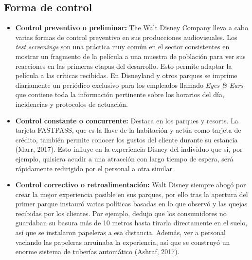 \subsection{Forma de control}

\begin{itemize}

\item
\textbf{Control preventivo o preliminar:} The Walt Disney Company lleva a cabo varias formas de control preventivo en sus producciones audiovisuales. Los \textit{test screenings} son una práctica muy común en el sector consistentes en mostrar un fragmento de la película a una muestra de población para ver sus reacciones en las primeras etapas del desarrollo. Esto permite adaptar la película a las críticas recibidas. En Disneyland y otros parques se imprime diariamente un periódico exclusivo para los empleados llamado \textit{Eyes \& Ears} que contiene toda la información pertinente sobre los horarios del día, incidencias y protocolos de actuación.

\item
\textbf{Control constante o concurrente:} Destaca en los parques y resorts. La tarjeta FASTPASS, que es la llave de la habitación y actúa como tarjeta de crédito, también permite conocer los gustos del cliente durante su estancia (Marr, 2017). Esto influye en la experiencia Disney del individuo que si, por ejemplo, quisiera acudir a una atracción con largo tiempo de espera, será rápidamente redirigido por el personal a otra similar.

\item
\textbf{Control correctivo o retroalimentación:} Walt Disney siempre abogó por crear la mejor experiencia posible en sus parques, por ello tras la apertura del primer parque instauró varias políticas basadas en lo que observó y las quejas recibidas por los clientes. Por ejemplo, dedujo que los consumidores no guardaban su basura más de 10 metros hasta tirarla directamente en el suelo, así que se instalaron papeleras a esa distancia. Además, ver a personal vaciando las papeleras arruinaba la experiencia, así que se construyó un enorme sistema de tuberías automático (Ashraf, 2017).

\end{itemize}